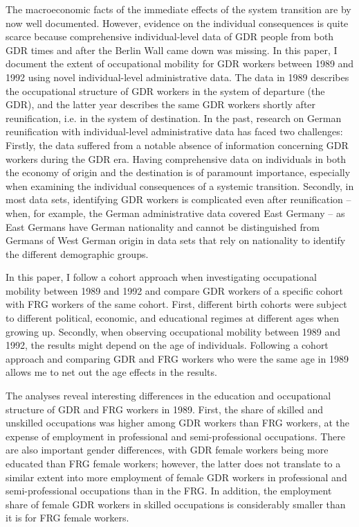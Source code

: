 \begin{Article}
\begin{refsection}[Spitz]
The macroeconomic facts of the immediate effects of the system transition are by now well documented. However, evidence on the individual consequences is quite scarce because comprehensive individual-level data of GDR people from both GDR times and after the Berlin Wall came down was missing. In this paper, I document the extent of occupational mobility for GDR workers between 1989 and 1992 using novel individual-level administrative data. The data in 1989 describes the occupational structure of GDR workers in the system of departure (the GDR), and the latter year describes the same GDR workers shortly after reunification, i.e. in the system of destination. In the past, research on German reunification with individual-level administrative data has faced two challenges: Firstly, the data suffered from a notable absence of information concerning GDR workers during the GDR era. Having comprehensive data on individuals in both the economy of origin and the destination is of paramount importance, especially when examining the individual consequences of a systemic transition. Secondly, in most data sets, identifying GDR workers is complicated even after reunification -- when, for example, the German administrative data covered East Germany -- as East Germans have German nationality and cannot be distinguished from Germans of West German origin in data sets that rely on nationality to identify the different demographic groups.


In this paper, I follow a cohort approach when investigating occupational mobility between 1989 and 1992 and compare GDR workers of a specific cohort with FRG workers of the same cohort. First, different birth cohorts were subject to different political, economic, and educational regimes at different ages when growing up. Secondly, when observing occupational mobility between 1989 and 1992, the results might depend on the age of individuals. Following a cohort approach and comparing GDR and FRG workers who were the same age in 1989 allows me to net out the age effects in the results.

The analyses reveal interesting differences in the education and occupational structure of GDR and FRG workers in 1989. First, the share of skilled and unskilled occupations was higher among GDR workers than FRG workers, at the expense of employment in professional and semi-professional occupations. There are also important gender differences, with GDR female workers being more educated than FRG female workers; however, the latter does not translate to a similar extent into more employment of female GDR workers in professional and semi-professional occupations than in the FRG. In addition, the employment share of female GDR workers in skilled occupations is considerably smaller than it is for FRG female workers.    


\end{refsection}
\end{Article}
